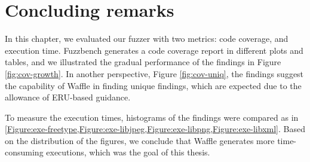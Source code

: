 \clearpage
\section{Concluding remarks}
\label{sec:ch5-conclusion}


In this chapter, we evaluated our fuzzer with two metrics: code coverage, and execution time. Fuzzbench generates a code coverage report in different plots and tables, and we illustrated the gradual performance of the findings in Figure \ref{fig:cov-growth}. In another perspective, Figure \ref{fig:cov-uniq}, the findings suggest the capability of Waffle in finding unique findings, which are expected due to the allowance of ERU-based guidance.

To measure the execution times, histograms of the findings were compared as in \cref{Figure:exe-freetype,Figure:exe-libjpeg,Figure:exe-libpng,Figure:exe-libxml}. Based on the distribution of the figures, we conclude that Waffle generates more time-consuming executions, which was the goal of this thesis.